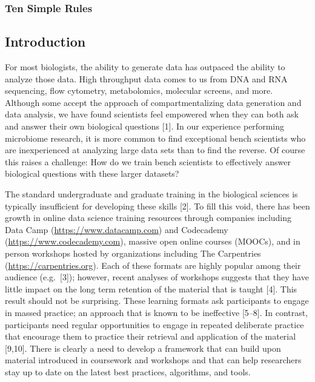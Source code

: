 \documentclass[
  11pt,
]{article}
\begin{document}
\vspace{5mm}

\hypertarget{ten-simple-rules}{%
\subsubsection{Ten Simple Rules}\label{ten-simple-rules}}

\newpage
\linenumbers

\hypertarget{introduction}{%
\subsection{Introduction}\label{introduction}}

For most biologists, the ability to generate data has outpaced the
ability to analyze those data. High throughput data comes to us from DNA
and RNA sequencing, flow cytometry, metabolomics, molecular screens, and
more. Although some accept the approach of compartmentalizing data
generation and data analysis, we have found scientists feel empowered
when they can both ask and answer their own biological questions
{[}1{]}. In our experience performing microbiome research, it is more
common to find exceptional bench scientists who are inexperienced at
analyzing large data sets than to find the reverse. Of course this
raises a challenge: How do we train bench scientists to effectively
answer biological questions with these larger datasets?

The standard undergraduate and graduate training in the biological
sciences is typically insufficient for developing these skills {[}2{]}.
To fill this void, there has been growth in online data science training
resources through companies including Data Camp
(\url{https://www.datacamp.com}) and Codecademy
(\url{https://www.codecademy.com}), massive open online courses (MOOCs),
and in person workshops hosted by organizations including The
Carpentries (\url{https://carpentries.org}). Each of these formats are
highly popular among their audience (e.g.~{[}3{]}); however, recent
analyses of workshops suggests that they have little impact on the long
term retention of the material that is taught {[}4{]}. This result
should not be surprising. These learning formats ask participants to
engage in massed practice; an approach that is known to be ineffective
{[}5--8{]}. In contrast, participants need regular opportunities to
engage in repeated deliberate practice that encourage them to practice
their retrieval and application of the material {[}9,10{]}. There is
clearly a need to develop a framework that can build upon material
introduced in coursework and workshops and that can help researchers
stay up to date on the latest best practices, algorithms, and tools.
\end{document}
